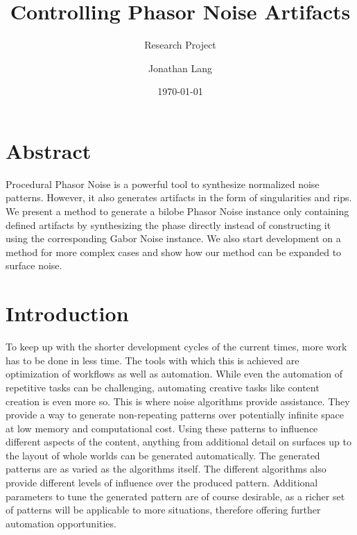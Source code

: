 \documentclass{utue} %
\title{Controlling Phasor Noise Artifacts}
\author{Jonathan Lang}
\date{\today}
\subtitle{Research Project}
\begin{document}

\maketitle 
 
\section*{Abstract}  
Procedural Phasor Noise is a powerful tool to synthesize normalized noise patterns. However, it also generates artifacts in the form of singularities and rips. We present a method to generate a bilobe Phasor Noise instance only containing defined artifacts by synthesizing the phase directly instead of constructing it using the corresponding Gabor Noise instance. We also start development on a method for more complex cases and show how our method can be expanded to surface noise.
  
\section{Introduction}   
To keep up with the shorter development cycles of the current times, more work has to be done in less time. The tools with which this is achieved are optimization of workflows as well as automation. While even the automation of repetitive tasks can be challenging, automating creative tasks like content creation is even more so. This is where noise algorithms provide assistance. They provide a way to generate non-repeating patterns over potentially infinite space at low memory and computational cost. Using these patterns to influence different aspects of the content, anything from additional detail on surfaces up to the layout of whole worlds can be generated automatically. The generated patterns are as varied as the algorithms itself. The different algorithms also provide different levels of influence over the produced pattern. Additional parameters to tune the generated pattern are of course desirable, as a richer set of patterns will be applicable to more situations, therefore offering further automation opportunities.
\end{document}
